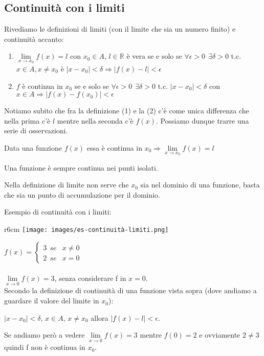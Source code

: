 \subsection{Continuità con i limiti}
Rivediamo le definizioni di limiti (con il limite che sia un numero finito)  e continuità accanto:
\begin{enumerate}
    \item $\lim\limits_{x\to x_0}f(x) = l$ con $x_0 \in A$, $l \in \mathbb{R}$ è vera se e solo se $\forall\epsilon > 0 \: \: \exists \delta >0$ t.c. $x \in A, x \neq x_0$ è $|x - x_0| < \delta \Longrightarrow |f(x) - l| < \epsilon$
    \item $f$ è continua in $x_0$ se e solo se $\forall \epsilon > 0 \: \: \exists \delta > 0$ t.c. $|x - x_0| < \delta$ con $x \in A \Longrightarrow |f(x) - f(x_0)| < \epsilon$
\end{enumerate}
Notiamo subito che fra la definizione (1) e la (2) c'è come unica differenza che nella prima c'è $l$ mentre nella seconda c'è $f(x)$. Possiamo dunque trarre una serie di osservazioni.
\begin{observation}
Data una funzione $f(x)$ essa è continua in $x_0 \Longrightarrow \lim\limits_{x\to x_0}f(x) = l$
\end{observation}
\begin{observation}
Una funzione è sempre continua nei punti isolati.
\end{observation}
\begin{observation}
Nella definizione di limite non serve che $x_0$ sia nel dominio di una funzione, basta che sia un punto di accumulazione per il dominio.
\end{observation}
\begin{example}
Esempio di continuità con i limiti:
\end{example}
\begin{wrapfigure}{r}{6cm}
    \vspace{-50pt}
    \centering
    \texttt{[image: images/es-continuità-limiti.png]}
    \caption{$\lim\limits_{x\to 0}f(x) = 3$}
\end{wrapfigure}

$f(x) = 
    \begin{cases}
        3 \: \: se & x \neq 0 \\
        2 \: \: se & x = 0
    \end{cases}
    $\\ \\
$\lim\limits_{x\to 0}f(x) = 3$, senza considerare f in $x = 0$.\\
Secondo la definizione di continuità di una funzione vista sopra (dove andiamo a guardare il valore del limite in $x_0$):
\begin{center}
    $|x - x_0| < \delta$, $x \in A$, $x \neq x_0$ allora $|f(x) - l| < \epsilon$.
\end{center}
Se andiamo però a vedere $\lim\limits_{x\to 0}f(x) = 3$ mentre $f(0) = 2$ e ovviamente $2 \neq 3$ quindi f non è continua in $x_0$.



